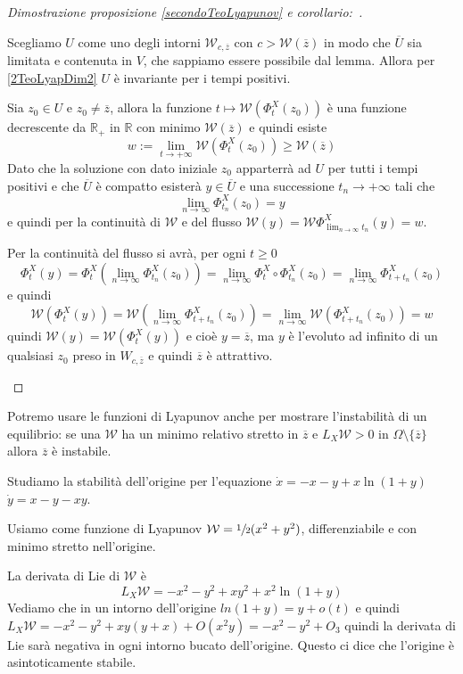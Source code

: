 \documentclass[11pt,a4paper,twoside]{book}
\newenvironment{esempio}[1][Esempio]{ 
  \begin{center}\begin{tcolorbox}[
  title={#1:\\},
  width=0.9\linewidth,
  flush right,
  enhanced jigsaw, 
  colback=white, 
  frame hidden, 
  sharpish corners, arc=3mm,
  borderline west = {1pt}{0pt}{gray},
  borderline south = {1pt}{0pt}{gray},
  coltitle=black, 
  fonttitle=\small\bfseries, 
  attach title to upper, 
  breakable,
  top=2.5pt, bottom=0.3pt]\small
  }{
 \normalsize \end{tcolorbox}\end{center}
}
\newenvironment{dimo}[1][\proofname]{
	\begin{tcolorbox}[
	breakable, 
	enhanced, 
	interior hidden, 
	frame hidden, 
	borderline west = {1pt}{0pt}{gray}, 
	top=0pt, bottom=0pt, left=0pt]
\begin{proof}[#1:~]
}
{
\end{proof}
\end{tcolorbox}
}
\theoremstyle{esss}
\theoremstyle{dotless}
\numberwithin{equation}{section} %
\begin{document}
\begin{dimo}[Dimostrazione proposizione \ref{secondoTeoLyapunov} e corollario]
\begin{enumerate}[i.]
Scegliamo $U$ come uno degli intorni $\mathcal{W}_{c,\overline{z}}$ con $c>\mathcal{W}(\overline{z})$ in modo che $\overline{U}$ sia limitata e contenuta in $V$, che sappiamo essere possibile dal lemma.
Allora per \ref{2TeoLyapDim2} $U$ è invariante per i tempi positivi.

Sia $z_0\in U$ e $z_0\neq\overline{z}$, allora la funzione $t\mapsto\mathcal{W}\left(\Phi_t^X(z_0)\right)$ è una funzione decrescente da $\mathbb{R}_+$ in $\mathbb{R}$ con minimo $\mathcal{W}(\overline{z})$ e quindi esiste
\[
w:=\lim_{t\rightarrow+\infty}\mathcal{W}(\Phi_t^X(z_0))\geq \mathcal{W}(\overline{z})
\]
Dato che la soluzione con dato iniziale $z_0$ apparterrà ad $U$ per tutti i tempi positivi e che $\overline{U}$ è compatto esisterà $y\in\overline{U}$ e una successione $t_n\rightarrow +\infty$ tali che 
\[
\lim_{n\rightarrow\infty} \Phi_{t_n}^X(z_0)=y
\]
e quindi per la continuità di $\mathcal{W}$ e del flusso $\mathcal{W}(y)=\mathcal{W}\Phi_{\lim_{n\rightarrow\infty}t_n}^X(y)=w$.

Per la continuità del flusso si avrà, per ogni $t\geq0$
\[
\Phi_t^X(y)=\Phi_t^X\left( \lim_{n\rightarrow\infty}\Phi_{t_n}^X(z_0) \right)=\lim_{n\rightarrow\infty} \Phi_t^X\circ\Phi_{t_n}^X (z_0)=\lim_{n\rightarrow\infty}\Phi_{t+t_n}^X (z_0)
\]
e quindi
\[
\mathcal{W}\left(\Phi_t^X(y)\right)=\mathcal{W} \left( \lim_{n\rightarrow\infty}\Phi_{t+t_n}^X (z_0) \right)=\lim_{n\rightarrow\infty}\mathcal{W} \left(\Phi_{t+t_n}^X (z_0) \right)=w
\]
quindi $\mathcal{W}(y)=\mathcal{W}(\Phi_t^X(y))$ e cioè $y=\overline{z}$, ma $y$ è l'evoluto ad infinito di un qualsiasi $z_0$ preso in $W_{c,\overline{z}}$ e quindi $\overline{z}$ è attrattivo. \qedhere
\end{enumerate}
\end{dimo}

Potremo usare le funzioni di Lyapunov anche per mostrare l'instabilità di un equilibrio: se una $\mathcal{W}$ ha un minimo relativo stretto in $\overline{z}$ e $L_X\mathcal{W}>0$ in $\Omega\setminus\{\overline{z}\}$ allora $\overline{z}$ è instabile.

\begin{esempio}
Studiamo la stabilità dell'origine per l'equazione $\dot{x}=-x-y+x\ln{(1+y)}$ $\dot{y}=x-y-xy$. 

Usiamo come funzione di Lyapunov $\mathcal{W}=\sfrac{1}{2}(x^2+y^2)$, differenziabile e con minimo stretto nell'origine.

La derivata di Lie di $\mathcal{W}$ è
\[
L_X \mathcal{W}=-x^2-y^2+xy^2+x^2\ln{(1+y)}
\]
Vediamo che in un intorno dell'origine $ln{(1+y)}=y+o(t)$ e quindi $L_X \mathcal{W}=-x^2-y^2+xy(y+x)+O(x^2y)=-x^2-y^2+O_3$ quindi la derivata di Lie sarà negativa in ogni intorno bucato dell'origine. Questo ci dice che l'origine è asintoticamente stabile.
\end{esempio}
\end{document}
